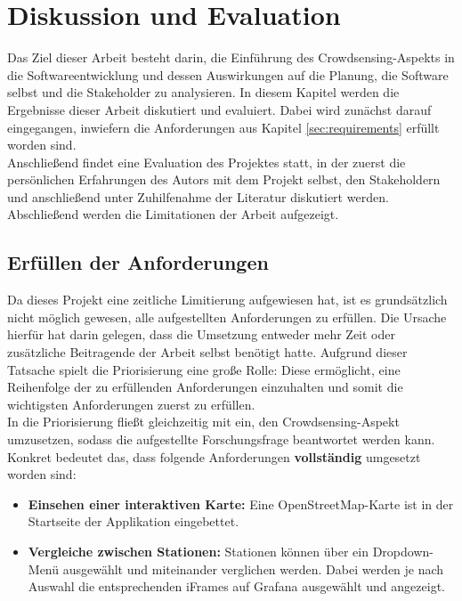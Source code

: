 \chapter{Diskussion und Evaluation}
Das Ziel dieser Arbeit besteht darin, die Einführung des Crowd\-sen\-sing-Aspekts in die Softwareentwicklung und dessen Auswirkungen auf die Planung, die Software selbst und die Stakeholder zu analysieren. In diesem Kapitel werden die Ergebnisse dieser Arbeit diskutiert und evaluiert. Dabei wird zunächst darauf eingegangen, inwiefern die Anforderungen aus Kapitel \ref{sec:requirements} erfüllt worden sind. \\ Anschließend findet eine Evaluation des Projektes statt, in der zuerst die persönlichen Erfahrungen des Autors mit dem Projekt selbst, den Stakeholdern und anschließend unter Zuhilfenahme der Literatur diskutiert werden. Abschließend werden die Limitationen der Arbeit aufgezeigt.
\label{sec:discussion}

\section{Erfüllen der Anforderungen}
\label{sec:requirements_evaluation}
Da dieses Projekt eine zeitliche Limitierung aufgewiesen hat, ist es grundsätzlich nicht möglich gewesen, alle aufgestellten Anforderungen zu erfüllen. Die Ursache hierfür hat darin gelegen, dass die Umsetzung entweder mehr Zeit oder zusätzliche Beitragende der Arbeit selbst benötigt hatte. Aufgrund dieser Tatsache spielt die Priorisierung eine große Rolle: Diese ermöglicht, eine Reihenfolge der zu erfüllenden Anforderungen einzuhalten und somit die wichtigsten Anforderungen zuerst zu erfüllen. \\ In die Priorisierung fließt gleichzeitig mit ein, den Crowdsensing-Aspekt umzusetzen, sodass die aufgestellte Forschungsfrage beantwortet werden kann. Konkret bedeutet das, dass folgende Anforderungen \textbf{vollständig} umgesetzt worden sind:

\begin{itemize}
    \item \textbf{Einsehen einer interaktiven Karte:} Eine OpenStreetMap-Karte ist in der Startseite der Applikation eingebettet.
    \item \textbf{Vergleiche zwischen Stationen:} Stationen können über ein Dropdown-Menü ausgewählt und miteinander verglichen werden. Dabei werden je nach Auswahl die entsprechenden iFrames auf Grafana ausgewählt und angezeigt.
\end{itemize}

